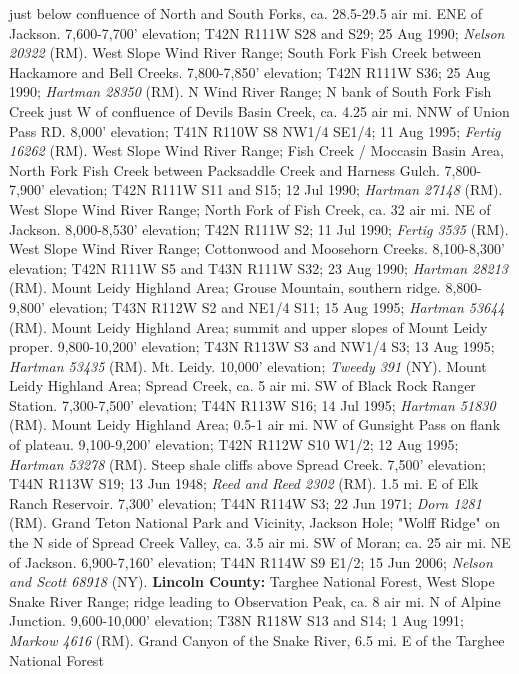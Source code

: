 just below confluence of North and South Forks, ca. 28.5-29.5 air mi. ENE of
Jackson. 7,600-7,700' elevation; T42N R111W S28 and S29; 25 Aug 1990;
\textit{Nelson 20322} (RM).
West Slope Wind River Range; South Fork Fish Creek between Hackamore and Bell
Creeks. 7,800-7,850' elevation; T42N R111W S36; 25 Aug 1990;
\textit{Hartman 28350} (RM).
N Wind River Range; N bank of South Fork Fish Creek just W of confluence of
Devils Basin Creek, ca. 4.25 air mi. NNW of Union Pass RD. 8,000' elevation;
T41N R110W S8 NW1/4 SE1/4; 11 Aug 1995; \textit{Fertig 16262} (RM).
West Slope Wind River Range; Fish Creek / Moccasin Basin Area, North Fork Fish
Creek between Packsaddle Creek and Harness Gulch. 7,800-7,900' elevation;
T42N R111W S11 and S15; 12 Jul 1990; \textit{Hartman 27148} (RM).
West Slope Wind River Range; North Fork of Fish Creek, ca. 32 air mi. NE of
Jackson. 8,000-8,530' elevation; T42N R111W S2; 11 Jul 1990;
\textit{Fertig 3535} (RM).
West Slope Wind River Range; Cottonwood and Moosehorn Creeks.
8,100-8,300' elevation; T42N R111W S5 and T43N R111W S32; 23 Aug 1990;
\textit{Hartman 28213} (RM).
Mount Leidy Highland Area; Grouse Mountain, southern ridge.
8,800-9,800' elevation; T43N R112W S2 and NE1/4 S11; 15 Aug 1995;
\textit{Hartman 53644} (RM).
Mount Leidy Highland Area; summit and upper slopes of Mount Leidy proper.
9,800-10,200' elevation; T43N R113W S3 and NW1/4 S3; 13 Aug 1995;
\textit{Hartman 53435} (RM).
Mt. Leidy. 10,000' elevation; \textit{Tweedy 391} (NY).
Mount Leidy Highland Area; Spread Creek, ca. 5 air mi. SW of Black Rock Ranger
Station. 7,300-7,500' elevation; T44N R113W S16; 14 Jul 1995;
\textit{Hartman 51830} (RM).
Mount Leidy Highland Area; 0.5-1 air mi. NW of Gunsight Pass on flank of
plateau. 9,100-9,200' elevation; T42N R112W S10 W1/2; 12 Aug 1995;
\textit{Hartman 53278} (RM).
Steep shale cliffs above Spread Creek. 7,500' elevation; T44N R113W S19;
13 Jun 1948; \textit{Reed and Reed 2302} (RM).
1.5 mi. E of Elk Ranch Reservoir. 7,300' elevation; T44N R114W S3; 22 Jun 1971;
\textit{Dorn 1281} (RM).
Grand Teton National Park and Vicinity, Jackson Hole; "Wolff Ridge" on the N
side of Spread Creek Valley, ca. 3.5 air mi. SW of Moran; ca. 25 air mi.
NE of Jackson. 6,900-7,160' elevation; T44N R114W S9 E1/2; 15 Jun 2006;
\textit{Nelson and Scott 68918} (NY).
  \textbf{Lincoln County:}
Targhee National Forest, West Slope Snake River Range; ridge leading to
Observation Peak, ca. 8 air mi. N of Alpine Junction. 9,600-10,000' elevation;
T38N R118W S13 and S14; 1 Aug 1991; \textit{Markow 4616} (RM).
Grand Canyon of the Snake River, 6.5 mi. E of the Targhee National Forest
